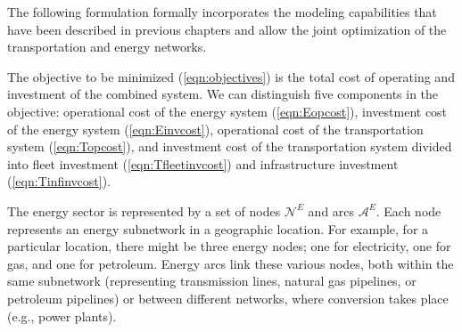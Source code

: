\documentclass{article}
\begin{document}
The following formulation formally incorporates the modeling capabilities that have been described in previous chapters and allow the joint optimization of the transportation and energy networks.

The objective to be minimized (\ref{eqn:objectives}) is the total cost of operating and investment of the combined system. We can distinguish five components in the objective: operational cost of the energy system (\ref{eqn:Eopcost}), investment cost of the energy system (\ref{eqn:Einvcost}), operational cost of the transportation system (\ref{eqn:Topcost}), and investment cost of the transportation system divided into fleet investment (\ref{eqn:Tfleetinvcost}) and infrastructure investment (\ref{eqn:Tinfinvcost}).

The energy sector is represented by a set of nodes $\mathcal{N}^E$ and arcs $\mathcal{A}^E$. Each node represents an energy subnetwork in a geographic location. For example, for a particular location, there might be three energy nodes; one for electricity, one for gas, and one for petroleum. Energy arcs link these various nodes, both within the same subnetwork (representing transmission lines, natural gas pipelines, or petroleum pipelines) or between different networks, where conversion takes place (e.g., power plants).
\end{document}
